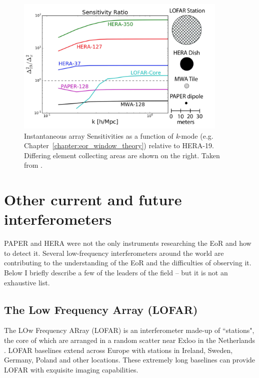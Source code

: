 \begin{figure}
\centering
\includegraphics[width=0.9\textwidth]{chapters/instruments/figures/deBoer_sensitivities.png}
\caption[Array sensitivity as a function of \textit{k}-mode relative to HERA-19]{Instantaneous array Sensitivities as a function of \textit{k}-mode (e.g. Chapter~\ref{chapter:eor_window_theory}) relative to HERA-19. Differing element collecting areas are shown on the right. Taken from \cite{deBoer.17}.}
\label{fig:instruments_sensitivity}
\end{figure}

\section{Other current and future interferometers}
\label{sec:not_used_in_this_work}

PAPER and HERA were not the only instruments researching the EoR and how to detect it. Several low-frequency interferometers around the world are contributing to the understanding of the EoR and the difficulties of observing it. Below I briefly describe a few of the leaders of the field -- but it is not an exhaustive list.

\subsection{The Low Frequency Array (LOFAR)}

The LOw Frequency ARray (LOFAR) is an interferometer made-up of ``stations", the core of which are arranged in a random scatter near Exloo in the Netherlands \citep{vanHaarlem.13}. LOFAR baselines extend across Europe with stations in Ireland, Sweden, Germany, Poland and other locations. These extremely long baselines can provide LOFAR with exquisite imaging capabilities. 

